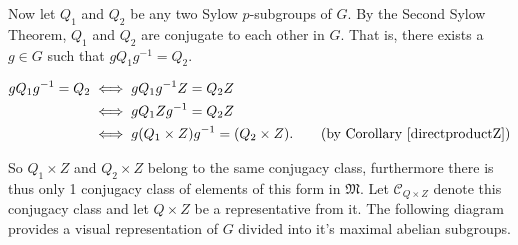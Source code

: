 Now let $Q_1$ and $Q_2$ be any two Sylow $p$-subgroups of $G$. By the Second Sylow Theorem, $Q_1$ and $Q_2$ are conjugate to each other in $G$. That is, there exists a $g \in G$ such that $gQ_1g^{-1} = Q_2$.

\begin{align*} gQ_1g^{-1} = Q_2 &\iff gQ_1g^{-1}Z = Q_2Z 
\\ &\iff gQ_1Zg^{-1} = Q_2Z
\\ &\iff g(Q_1 \times Z)g^{-1} = (Q_2 \times Z). \tag{by Corollary \ref{directproductZ}}
\end{align*} 

So $Q_1 \times Z$ and $Q_2 \times Z$ belong to the same conjugacy class, furthermore there is thus only 1 conjugacy class of elements of this form in $\mathfrak{M}$. Let $\mathcal{C}_{Q \times Z}$ denote this conjugacy class and let $Q \times Z$ be a representative from it. The following diagram provides a visual representation of $G$ divided into it's maximal abelian subgroups.







